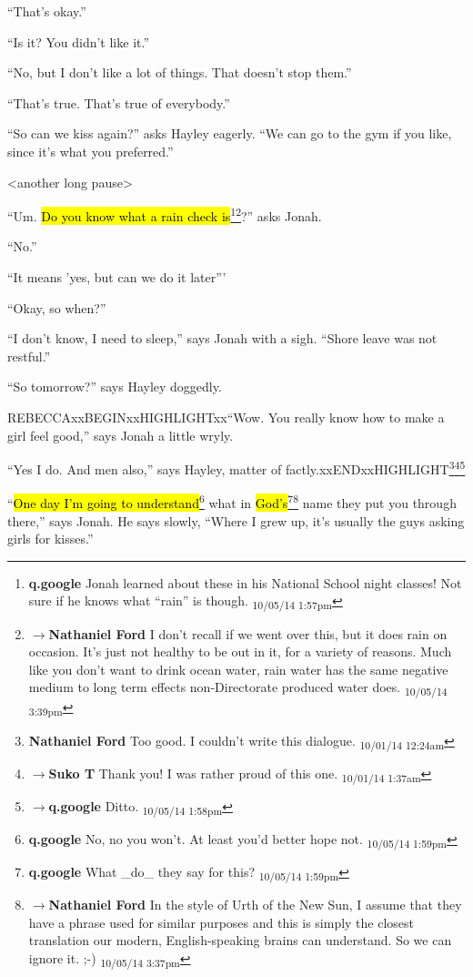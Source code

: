 ``That's okay.''

``Is it?  You didn't like it.''

``No, but I don't like a lot of things.  That doesn't stop them.''

``That's true.  That's true of everybody.''

``So can we kiss again?'' asks Hayley eagerly.  ``We can go to the gym if you like, since it's what you preferred.''

\textless another long pause\textgreater 

``Um.  \hl{Do you know what a rain check is}\footnote{\textbf{q.google }Jonah learned about these in his National School night classes!  Not sure if he knows what ``rain'' is though. \textsubscript{10/05/14 1:57pm}}\footnote{$\rightarrow$\textbf{Nathaniel Ford }I don't recall if we went over this, but it does rain on occasion. It's just not healthy to be out in it, for a variety of reasons. Much like you don't want to drink ocean water, rain water has the same negative medium to long term effects non-Directorate produced water does. \textsubscript{10/05/14 3:39pm}}?'' asks Jonah.

``No.''

``It means 'yes, but can we do it later'''

``Okay, so when?''

``I don't know, I need to sleep,'' says Jonah with a sigh.  ``Shore leave was not restful.''

``So tomorrow?'' says Hayley doggedly.

REBECCAxxBEGINxxHIGHLIGHTxx``Wow.  You really know how to make a girl feel good,'' says Jonah a little wryly.

``Yes I do.  And men also,'' says Hayley, matter of factly.xxENDxxHIGHLIGHT\footnote{\textbf{Nathaniel Ford }Too good. I couldn't write this dialogue. \textsubscript{10/01/14 12:24am}}\footnote{$\rightarrow$\textbf{Suko T }Thank you!  I was rather proud of this one. \textsubscript{10/01/14 1:37am}}\footnote{$\rightarrow$\textbf{q.google }Ditto. \textsubscript{10/05/14 1:58pm}}

``\hl{One day I'm going to understand}\footnote{\textbf{q.google }No, no you won't.  At least you'd better hope not. \textsubscript{10/05/14 1:59pm}} what in \hl{God's}\footnote{\textbf{q.google }What \_do\_ they say for this? \textsubscript{10/05/14 1:59pm}}\footnote{$\rightarrow$\textbf{Nathaniel Ford }In the style of Urth of the New Sun, I assume that they have a phrase used for similar purposes and this is simply the closest translation our modern, English-speaking brains can understand. So we can ignore it. ;-) \textsubscript{10/05/14 3:37pm}} name they put you through there,'' says Jonah.  He says slowly, ``Where I grew up, it's usually the guys asking girls for kisses.''

